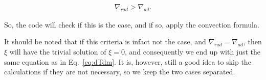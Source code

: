 \documentclass[11pt,twocolumn]{article}
\begin{document}
\begin{align}
    \nabla_{rad} > \nabla_{ad}\label{eq:instability-criterion}.
\end{align}


So, the code will check if this is the case, and if so, apply the convection formula.

It should be noted that if this criteria is infact not the case, and $\nabla_{rad} = \nabla_{ad}$, then $\xi$ will have the trivial solution of $\xi=0$, and consequently we end up with just the same equation as in Eq.~\eqref{eq:dTdm}. It is, however, still a good idea to skip the calculations if they are not necessary, so we keep the two cases separated.



\printbibliography
\end{document}
